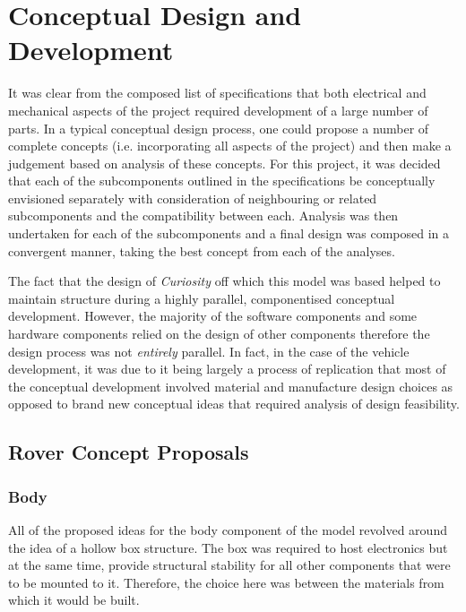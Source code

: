 \section{Conceptual Design and Development}
  It was clear from the composed list of specifications that both electrical and mechanical aspects of the project required development of a large number of parts. In a typical conceptual design process, one could propose a number of complete concepts (i.e. incorporating all aspects of the project) and then make a judgement based on analysis of these concepts. For this project, it was decided that each of the subcomponents outlined in the specifications be conceptually envisioned separately with consideration of neighbouring or related subcomponents and the compatibility between each. Analysis was then undertaken for each of the subcomponents and a final design was composed in a convergent manner, taking the best concept from each of the analyses.
  
  The fact that the design of \textit{Curiosity} off which this model was based helped to maintain structure during a highly parallel, componentised conceptual development. However, the majority of the software components and some hardware components relied on the design of other components therefore the design process was not \textit{entirely} parallel. In fact, in the case of the vehicle development, it was due to it being largely a process of replication that most of the conceptual development involved material and manufacture design choices as opposed to brand new conceptual ideas that required analysis of design feasibility.
  
  \subsection{Rover Concept Proposals}
  \label{subsec:rover-concept-proposals}    
    \subsubsection{Body}
      All of the proposed ideas for the body component of the model revolved around the idea of a hollow box structure. The box was required to host electronics but at the same time, provide structural stability for all other components that were to be mounted to it. Therefore, the choice here was between the materials from which it would be built.
      
